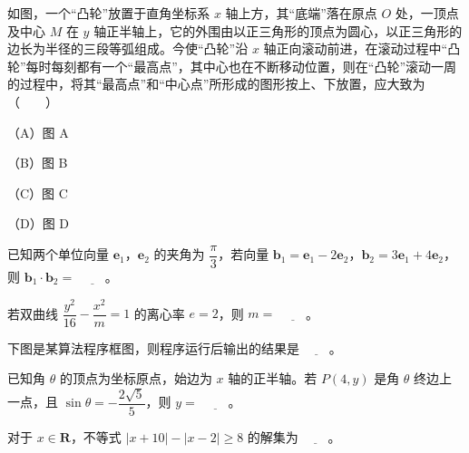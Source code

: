 \begin{question}
如图，一个“凸轮”放置于直角坐标系 $x$ 轴上方，其“底端”落在原点 $O$ 处，一顶点及中心 $M$ 在 $y$ 轴正半轴上，它的外围由以正三角形的顶点为圆心，以正三角形的边长为半径的三段等弧组成。今使“凸轮”沿 $x$ 轴正向滚动前进，在滚动过程中“凸轮”每时每刻都有一个“最高点”，其中心也在不断移动位置，则在“凸轮”滚动一周的过程中，将其“最高点”和“中心点”所形成的图形按上、下放置，应大致为\mbox{（　　）}

（A）图 A

（B）图 B

（C）图 C

（D）图 D
\nopagebreak[4]
\begin{center}\end{center}
\nopagebreak[4]
\end{question}

\begin{question}
已知两个单位向量 $\boldsymbol e_1$，$\boldsymbol e_2$ 的夹角为 $\dfrac\pi3$，若向量 $\boldsymbol b_1=\boldsymbol e_1-2\boldsymbol e_2$，$\boldsymbol b_2=3\boldsymbol e_1+4\boldsymbol e_2$，则 $\boldsymbol b_1\cdot\boldsymbol b_2=$ $\underline{\qquad}$。

\end{question}
\begin{question}
若双曲线 $\dfrac{y^2}{16}-\dfrac{x^2}{m}=1$ 的离心率 $e=2$，则 $m=$ $\underline{\qquad}$。

\Needspace{0.4\textheight}
\end{question}
\begin{question}
下图是某算法程序框图，则程序运行后输出的结果是 $\underline{\qquad}$。
\nopagebreak[4]
\begin{center}\end{center}
\nopagebreak[4]
\end{question}
\begin{question}
已知角 $\theta$ 的顶点为坐标原点，始边为 $x$ 轴的正半轴。若 $P(4,y)$ 是角 $\theta$ 终边上一点，且 $\sin\theta=-\dfrac{2\sqrt5}5$，则 $y=$ $\underline{\qquad}$。

\end{question}
\begin{question}
对于 $x\in\mathbf R$，不等式 $|x+10|-|x-2|\geqslant8$ 的解集为 $\underline{\qquad}$。

\end{question}

